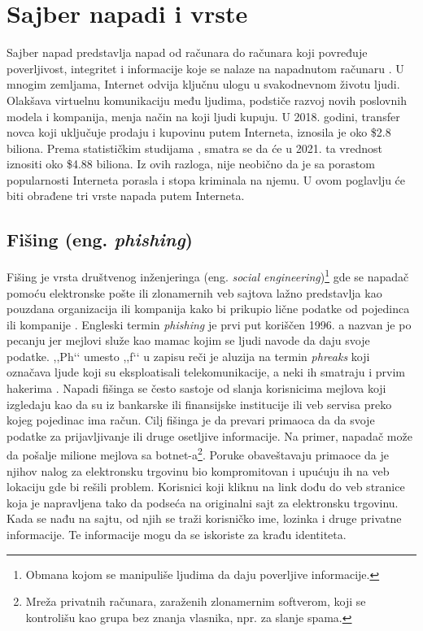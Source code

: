 \documentclass[a4paper]{article}
\theoremstyle{break}
\begin{document}
{\newpage


\section{Sajber napadi i vrste}
\label{sec:sajber_napadi_vrste}

Sajber napad predstavlja napad od računara do računara koji povređuje poverljivost, integritet i informacije koje se nalaze na napadnutom računaru \cite{knjiga}. 
U mnogim zemljama, Internet odvija ključnu ulogu u svakodnevnom životu ljudi. Olakšava virtuelnu komunikaciju među ljudima, podstiče razvoj novih poslovnih modela i kompanija, menja način na koji ljudi kupuju. U 2018. godini, transfer novca koji uključuje prodaju i kupovinu putem Interneta, iznosila je oko \$2.8 biliona. Prema statističkim studijama \cite{statistika}, smatra se da će u 2021. ta vrednost iznositi oko \$4.88 biliona. Iz ovih razloga, nije neobično da je sa porastom popularnosti Interneta porasla i stopa kriminala na njemu. U ovom poglavlju će biti obrađene tri vrste napada putem Interneta.



\subsection{Fišing (eng. {\em phishing})}
\label{subsec:phishing}

Fišing je vrsta društvenog inženjeringa (eng. {\em social engineering})\footnote{Obmana kojom se manipuliše ljudima da daju poverljive informacije.} gde se napadač pomoću elektronske pošte ili zlonamernih veb sajtova lažno predstavlja kao pouzdana organizacija ili kompanija kako bi prikupio lične podatke od pojedinca ili kompanije \cite{phishing_us_cert}. Engleski termin {\em  phishing} je prvi put koriščen 1996. a nazvan je po pecanju jer mejlovi služe kao mamac kojim se ljudi navode da daju svoje podatke. ,,Ph‘‘ umesto ,,f‘‘ u zapisu reči je aluzija na termin {\em phreaks} koji označava ljude koji su eksploatisali telekomunikacije, a neki ih smatraju i prvim hakerima \cite{phishing_org}.
Napadi fišinga se često sastoje od slanja korisnicima mejlova koji izgledaju kao da su iz bankarske ili finansijske institucije ili veb servisa preko kojeg pojedinac ima račun. Cilj fišinga je da prevari primaoca da da svoje podatke za prijavljivanje ili druge osetljive informacije. 
Na primer, napadač može da pošalje milione mejlova sa botnet-a\footnote{Mreža privatnih računara, zaraženih zlonamernim softverom, koji se kontrolišu kao grupa bez znanja vlasnika, npr. za slanje spama.}. Poruke obaveštavaju primaoce da je njihov nalog za elektronsku trgovinu bio kompromitovan i upućuju ih na veb lokaciju gde bi rešili problem. Korisnici koji kliknu na link dođu do veb stranice koja je napravljena tako da podseća na originalni sajt za elektronsku trgovinu. Kada se nađu na sajtu, od njih se traži korisničko ime, lozinka i druge privatne informacije. Te informacije mogu da se iskoriste za krađu identiteta.

}
\end{document}
